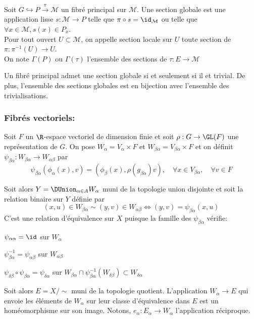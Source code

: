 \begin{defi}
Soit $G \hookrightarrow P \overset{\pi}{\to} \mathcal{M}$ un fibré principal sur $\mathcal{M}$. Une section globale est une application lisse $s:\mathcal{M} \to P$ telle que $\pi \circ s = \id_\mathcal{M}$ ou telle que $\forall x\in \mathcal{M}, s(x) \in P_x$. \\
Pour tout ouvert $U\subset \mathcal{M}$, on appelle section locale sur $U$ toute section de $\pi : \pi^{-1}(U) \to U$. \\
On note $\Gamma(P)$ ou $\Gamma(\tau)$ l'ensemble des sections de $\tau: E \to \mathcal{M}$
\end{defi}

\begin{pro}
Un fibré principal admet une section globale si et seulement si il et trivial. De plus, l'ensemble des sections globales est en bijection avec l'ensemble des trivialisations.
\end{pro}

\subsubsection{Fibrés vectoriels:}

Soit $F$ un $\R$-espace vectoriel de dimension finie et soit $\rho : G \to \GL(F)$ une représentation de $G$. On pose $W_\alpha = V_\alpha\times F$ et $W_{\beta\alpha} = V_{\beta\alpha}\times F$ et on définit $\psi_{\beta\alpha} : W_{\beta\alpha} \to W_{\alpha\beta}$ par
$$\psi_{\beta\alpha}(\phi_\alpha(x), v) = (\phi_\beta(x), \rho(g_{\beta\alpha})v), \quad \forall x\in V_{\beta\alpha}, \quad \forall v\in F$$

Soit alors $Y = \DUnion_{\alpha \in A} W_\alpha$ muni de la topologie union disjointe et soit la relation binaire sur $Y$ définie par
$$(x,u)\in W_{\beta\alpha} \sim (y, v)\in W_{\alpha\beta} \iff (y, v) = \psi_{\beta\alpha}(x, u)$$
C'est une relation d'équivalence sur $X$ puisque la famille des $\psi_{\beta\alpha}$ vérifie:
\be
	\item $\psi_{\alpha\alpha} = \id$ sur $W_\alpha$
	\item $\psi_{\beta\alpha}^{-1} = \psi_{\alpha\beta}$ sur $W_{\alpha\beta}$
	\item $\psi_{\delta\beta} \circ \psi_{\beta\alpha} = \psi_{\delta\alpha}$ sur $W_{\beta\alpha} \cap \psi_{\beta\alpha}^{-1}(W_{\delta\beta}) \subset W_{\delta\alpha}$ \\
\ee

Soit alors $E = X/\sim$ muni de la topologie quotient. L'application $W_\alpha \to E$ qui envoie les éléments de $W_\alpha$ sur leur classe d'équivalence dans $E$ est un homéomorphisme sur son image. Notons, $e_\alpha: E_\alpha \to W_\alpha$ l'application réciproque. \\

